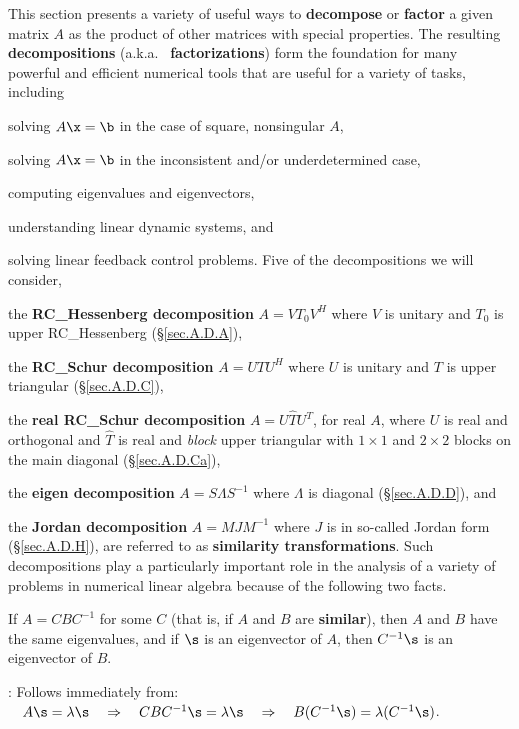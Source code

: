 This section presents a variety of useful ways to {\bf decompose} or
{\bf factor} a given matrix $A$ as the product of other matrices with
special properties.  The resulting {\bf decompositions} (a.k.a.~{\bf
factorizations}) form the foundation for many powerful and efficient
numerical tools that are useful for a variety of tasks, including
\beginmylistb
\item solving $A\x=\b$ in the case of square, nonsingular $A$,
\item solving $A\x=\b$ in the inconsistent and/or underdetermined case,
\item computing eigenvalues and eigenvectors,
\item understanding linear dynamic systems, and
\item solving linear feedback control problems.
\endmylist
Five of the decompositions we will consider,
\beginmylistb
\item the {\bf RC_Hessenberg decomposition} $A=V T_{0} V^{H}$ where $V$ is unitary and $T_0$ is upper RC_Hessenberg (\S \ref{sec.A.D.A}),
\item the {\bf RC_Schur decomposition} $A=UTU^{H}$ where $U$ is unitary and $T$ is upper triangular (\S \ref{sec.A.D.C}),
\item the {\bf real RC_Schur decomposition} $A=U{\hat T}U^{T}$, for real $A$, where $U$ is real and orthogonal and ${\hat T}$ is real and
{\it block} upper triangular with $1\times 1$ and $2\times 2$ blocks on the main diagonal (\S \ref{sec.A.D.Ca}),
\item the {\bf eigen decomposition} $A=S\Lambda S^{-1}$ where $\Lambda$ is diagonal (\S \ref{sec.A.D.D}), and
\item the {\bf Jordan decomposition} $A=MJM^{-1}$ where $J$ is in so-called Jordan form (\S \ref{sec.A.D.H}),
\endmylist
are referred to as {\bf similarity transformations}.  Such
decompositions play a particularly important role in the analysis of a
variety of problems in numerical linear algebra because of the
following two facts.\medskip

\begin{fact} \label{fact.A.D.A}
If $A=CBC^{-1}$ for some $C$ (that is, if $A$
and $B$ are {\bf similar}), then $A$ and $B$ have the same
eigenvalues, and if $\s$ is an eigenvector of $A$, then $C^{-1}\s$ is
an eigenvector of $B$.
\end{fact}

\/: Follows immediately from:
$\quad A\s=\lambda\s \quad \Rightarrow \quad CBC^{-1}\s=\lambda\s \quad \Rightarrow \quad B(C^{-1}\s)=\lambda(C^{-1}\s)$. \endproof

